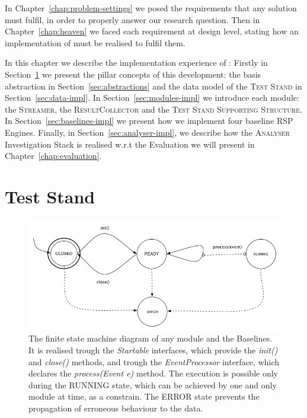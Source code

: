 In Chapter~\ref{chap:problem-settings} we posed the requirements that any solution must fulfil, in order to properly answer our research question. Then in Chapter~\ref{chap:heaven} we faced each requirement at design level, stating how an implementation of \name must be realised to fulfil them. 

In this chapter we describe the implementation experience of \namens: 
Firstly in Section~\ref{sec:test-stand-general} we present the pillar concepts of this development: the basis abstraction in Section~\ref{sec:abstractions} and the data model of the \textsc{Test Stand} in Section~\ref{sec:data-impl}. In Section~\ref{sec:modules-impl} we introduce each \name module: the \textsc{Streamer}, the \textsc{ResultCollector} and the \textsc{Test Stand Supporting Structure}. In Section~\ref{sec:baselines-impl} we present how we implement four baseline RSP Engines. Finally, in Section~\ref{sec:analyser-impl}, we describe how the \textsc{Analyser} Investigation Stack is realised w.r.t the Evaluation we will present in Chapter~\ref{chap:evaluation}.

\section{Test Stand}\label{sec:test-stand-general}

\begin{figure}[h!tb]
  \centering
	\includegraphics[width=\linewidth]{images/fsm-schema}
	\caption[\textit{EventProcessor} States Diagram]{The finite state machine diagram of any \name module and the Baselines. It is realised trough the \textit{Startable} interfaces, which provide the \textit{init()} and \textit{close() }methods, and trough the \textit{EventProcessor} interface, which declares the \textit{process(Event e)} method. The execution is possible only during the RUNNING state, which can be achieved by one and only module at time, as a constrain. The ERROR state prevents the propagation of erroneous behaviour to the data.}
  	\label{fig:module-fsm}
\end{figure}

